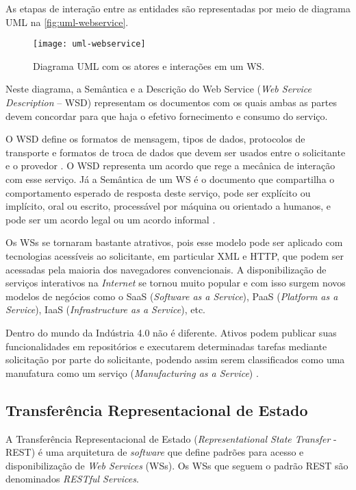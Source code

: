 	As etapas de interação entre as entidades são representadas por meio de diagrama UML na \autoref{fig:uml-webservice}. 
	
	\begin{figure}[htb]
		\centering
		\caption{Diagrama UML com os atores e interações em um WS.}
		\label{fig:uml-webservice}
		\texttt{[image: uml-webservice]}
	\end{figure}

	Neste diagrama, a Semântica e a Descrição do Web Service (\textit{Web Service Description} -- WSD) representam os documentos com os quais ambas as partes devem concordar para que haja o efetivo fornecimento e consumo do serviço.
	
	O WSD define os formatos de mensagem, tipos de dados, protocolos de transporte e formatos de troca de dados que devem ser usados entre o solicitante e o provedor \cite{booth2004webservice}. O WSD representa um acordo que rege a mecânica de interação com esse serviço. Já a Semântica de um WS é o documento que compartilha o comportamento esperado de resposta deste serviço, pode ser explícito ou implícito, oral ou escrito, processável por máquina ou orientado a humanos, e pode ser um acordo legal ou um acordo informal \cite{booth2004webservice}.

	Os WSs se tornaram bastante atrativos, pois esse modelo pode ser aplicado com tecnologias acessíveis ao solicitante, em particular XML e HTTP, que podem ser acessadas pela maioria dos navegadores convencionais. A disponibilização de serviços interativos na \textit{Internet} se tornou muito popular e com isso surgem novos modelos de negócios como o SaaS (\textit{Software as a Service}), PaaS (\textit{Platform as a Service}), IaaS (\textit{Infrastructure as a Service}), etc.
	
	Dentro do mundo da Indústria 4.0 não é diferente. Ativos podem publicar suas funcionalidades em repositórios e executarem determinadas tarefas mediante solicitação por parte do solicitante, podendo assim serem classificados como uma manufatura como um serviço (\textit{Manufacturing as a Service}) \cite{annunziata2019maas, nichols2020maas, siepen2019maas}.
	
	\subsection{Transferência Representacional de Estado}
	
	A Transferência Representacional de Estado (\textit{Representational State Transfer} - REST) é uma arquitetura de \textit{software} que define padrões para acesso e disponibilização de \textit{Web Services} (WSs). Os WSs que seguem o padrão REST são denominados \textit{RESTful Services}.
	
